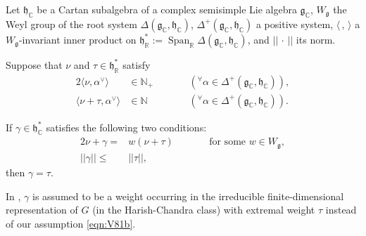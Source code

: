 \begin{lemma}
\label{lem:V7218}
Let ${\mathfrak{h}}_{\mathbb{C}}$ be a Cartan subalgebra
 of a complex semisimple Lie algebra ${\mathfrak{g}}_{\mathbb{C}}$, 
 $W_{\mathfrak{g}}$ the Weyl group 
 of the root system $\Delta({\mathfrak{g}}_{\mathbb{C}}, {\mathfrak{h}}_{\mathbb{C}})$, 
 $\Delta^+({\mathfrak{g}}_{\mathbb{C}}, {\mathfrak{h}}_{\mathbb{C}})$ 
 a positive system,
 $\langle \, , \, \rangle$ 
 a $W_{\mathfrak{g}}$-invariant inner product 
 on ${\mathfrak{h}}_{\mathbb{R}}^{\ast}:=\operatorname{Span}_{\mathbb{R}} \Delta ({\mathfrak{g}}_{\mathbb{C}}, {\mathfrak{h}}_{\mathbb{C}})$, 
 and $||\,\cdot\,||$ its norm.  



Suppose that $\nu$ and $\tau \in {\mathfrak{h}}_{\mathbb{R}}^{\ast}$
 satisfy
\begin{alignat*}{2}
\langle \nu, \alpha^{\vee} \rangle &\in {\mathbb{N}}_+
\qquad
&&({}^{\forall} \alpha \in \Delta^+({\mathfrak{g}}_{\mathbb{C}}, {\mathfrak{h}}_{\mathbb{C}})), 
\\
\langle \nu+\tau, \alpha^{\vee} \rangle &\in {\mathbb{N}}
\qquad
&&({}^{\forall} \alpha \in \Delta^+({\mathfrak{g}}_{\mathbb{C}}, {\mathfrak{h}}_{\mathbb{C}})).  
\end{alignat*}

If $\gamma \in {\mathfrak{h}}_{\mathbb{C}}^{\ast}$
 satisfies the following two conditions:
\begin{alignat}{2}
\nu + \gamma =& w (\nu+\tau)
\qquad
&&\text{for some $w  \in W_{\mathfrak{g}}$}, 
\label{eqn:V81a}
\\
|| \gamma || \le& ||\tau||, 
\qquad
&&
\label{eqn:V81b}
\end{alignat}
then $\gamma = \tau$.  
\end{lemma}

\begin{remark}
In \cite[Lem.~7.2.18]{Vogan81}, 
$\gamma$ is assumed to be a weight
 occurring in the irreducible finite-dimensional representation
 of $G$ 
 (in the Harish-Chandra class)
 with extremal weight $\tau$
 instead of our assumption \eqref{eqn:V81b}.  
\end{remark}

